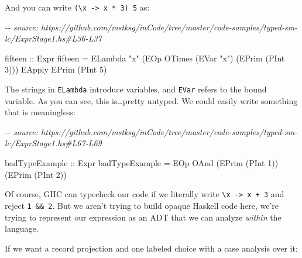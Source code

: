 \documentclass[]{article}
\newenvironment{Shaded}{}{}
\newcommand{\CommentTok}[1]{\textcolor[rgb]{0.38,0.63,0.69}{\textit{#1}}}
\newcommand{\DataTypeTok}[1]{\textcolor[rgb]{0.56,0.13,0.00}{#1}}
\newcommand{\DecValTok}[1]{\textcolor[rgb]{0.25,0.63,0.44}{#1}}
\newcommand{\NormalTok}[1]{#1}
\newcommand{\OtherTok}[1]{\textcolor[rgb]{0.00,0.44,0.13}{#1}}
\newcommand{\StringTok}[1]{\textcolor[rgb]{0.25,0.44,0.63}{#1}}
\begin{document}
And you can write \texttt{(\textbackslash{}x\ -\textgreater{}\ x\ *\ 3)\ 5} as:

\begin{Shaded}
\begin{Highlighting}[]
\CommentTok{{-}{-} source: https://github.com/mstksg/inCode/tree/master/code{-}samples/typed{-}sm{-}lc/ExprStage1.hs\#L36{-}L37}

\OtherTok{fifteen ::} \DataTypeTok{Expr}
\NormalTok{fifteen }\OtherTok{=} \DataTypeTok{ELambda} \StringTok{"x"}\NormalTok{ (}\DataTypeTok{EOp} \DataTypeTok{OTimes}\NormalTok{ (}\DataTypeTok{EVar} \StringTok{"x"}\NormalTok{) (}\DataTypeTok{EPrim}\NormalTok{ (}\DataTypeTok{PInt} \DecValTok{3}\NormalTok{))) }\OtherTok{\textasciigrave{}EApply\textasciigrave{}} \DataTypeTok{EPrim}\NormalTok{ (}\DataTypeTok{PInt} \DecValTok{5}\NormalTok{)}
\end{Highlighting}
\end{Shaded}

The strings in \texttt{ELambda} introduce variables, and \texttt{EVar} refers to
the bound variable. As you can see, this is\ldots pretty untyped. We could
easily write something that is meaningless:

\begin{Shaded}
\begin{Highlighting}[]
\CommentTok{{-}{-} source: https://github.com/mstksg/inCode/tree/master/code{-}samples/typed{-}sm{-}lc/ExprStage1.hs\#L67{-}L69}

\OtherTok{badTypeExample ::} \DataTypeTok{Expr}
\NormalTok{badTypeExample }\OtherTok{=}
  \DataTypeTok{EOp} \DataTypeTok{OAnd}\NormalTok{ (}\DataTypeTok{EPrim}\NormalTok{ (}\DataTypeTok{PInt} \DecValTok{1}\NormalTok{)) (}\DataTypeTok{EPrim}\NormalTok{ (}\DataTypeTok{PInt} \DecValTok{2}\NormalTok{))}
\end{Highlighting}
\end{Shaded}

Of course, GHC can typecheck our code if we literally write
\texttt{\textbackslash{}x\ -\textgreater{}\ x\ +\ 3} and reject
\texttt{1\ \&\&\ 2}. But we aren't trying to build opaque Haskell code here,
we're trying to represent our expression as an ADT that we can analyze
\emph{within} the language.

If we want a record projection and one labeled choice with a case analysis over
it:
\end{document}
